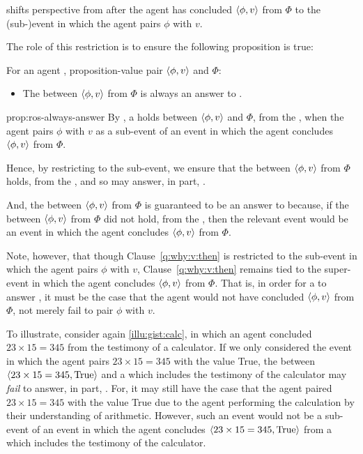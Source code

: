 \begin{note}
  \qWhyV{} shifts perspective from after the agent has concluded \(\langle \phi, v \rangle\) from \(\Phi\) to the (sub-)event in which the agent pairs \(\phi\) with \(v\).

  The role of this restriction is to ensure the following proposition is true:

  \begin{proposition}
    \label{prop:ros-always-answer}
    For an agent \vAgent{}, proposition-value pair \(\langle \phi, v \rangle\) and \poP{} \(\Phi\):

    \begin{itemize}
    \item
      The \ros{} between \(\langle \phi, v \rangle\) from \(\Phi\) is always an answer to \qWhyV{}.
    \end{itemize}
  \end{proposition}

  \begin{argument}{prop:ros-always-answer}
    By \supportI{}, a \ros{} holds between \(\langle \phi, v \rangle\) and \(\Phi\), from the \agpe{}, when the agent pairs \(\phi\) with \(v\) as a sub-event of an event in which the agent concludes \(\langle \phi, v \rangle\) from \(\Phi\).

    Hence, by restricting \qWhyV{} to the sub-event, we ensure that the \ros{} between \(\langle \phi, v \rangle\) from \(\Phi\) holds, from the \agpe{}, and so may answer, in part, \qWhyV{}.

    And, the \ros{} between \(\langle \phi, v \rangle\) from \(\Phi\) is guaranteed to be an answer to \qWhyV{} because, if the \ros{} between \(\langle \phi, v \rangle\) from \(\Phi\) did not hold, from the \agpe{}, then the relevant event would be an event in which the agent concludes \(\langle \phi, v \rangle\) from \(\Phi\).
    \end{argument}


  Note, however, that though Clause~\ref{q:why:v:then} is restricted to the sub-event in which the agent pairs \(\phi\) with \(v\), Clause~\ref{q:why:v:then} remains tied to the super-event in which the agent concludes \(\langle \phi, v \rangle\) from \(\Phi\).
  That is, in order for a \ros{} to answer \qWhyV{}, it must be the case that the agent would not have concluded \(\langle \phi, v \rangle\) from \(\Phi\), not merely fail to pair \(\phi\) with \(v\).

  To illustrate, consider again \autoref{illu:gist:calc}, in which an agent concluded \(23 \times 15 = 345\) from the testimony of a calculator.
  If we only considered the event in which the agent pairs \(23 \times 15 = 345\) with the value True, the \ros{} between \(\langle 23 \times 15 = 345, \text{True} \rangle\) and a \poP{} which includes the testimony of the calculator may \emph{fail} to answer, in part, \qWhyV{}.
  For, it may still have the case that the agent paired \(23 \times 15 = 345\) with the value True due to the agent performing the calculation by their understanding of arithmetic.
  However, such an event would not be a sub-event of an event in which the agent concludes \(\langle 23 \times 15 = 345, \text{True} \rangle\) from a \poP{} which includes the testimony of the calculator.
\end{note}

